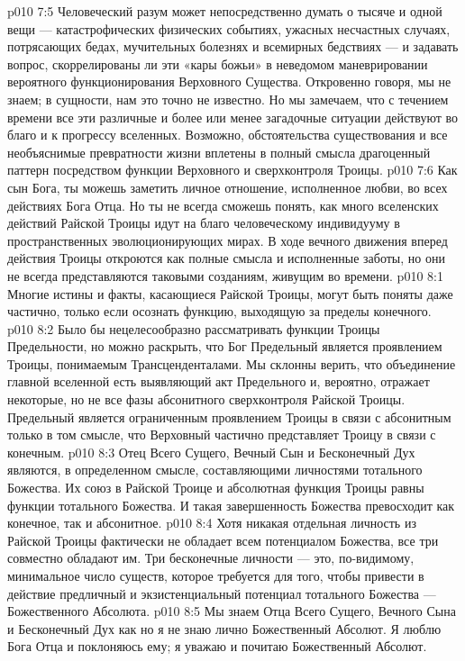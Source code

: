\vs p010 7:5 Человеческий разум может непосредственно думать о тысяче и одной вещи --- катастрофических физических событиях, ужасных несчастных случаях, потрясающих бедах, мучительных болезнях и всемирных бедствиях --- и задавать вопрос, скоррелированы ли эти «кары божьи» в неведомом маневрировании вероятного функционирования Верховного Существа. Откровенно говоря, мы не знаем; в сущности, нам это точно не известно. Но мы замечаем, что с течением времени все эти различные и более или менее загадочные ситуации  действуют во благо и к прогрессу вселенных. Возможно, обстоятельства существования и все необъяснимые превратности жизни вплетены в полный смысла драгоценный паттерн посредством функции Верховного и сверхконтроля Троицы.
\vs p010 7:6 Как сын Бога, ты можешь заметить личное отношение, исполненное любви, во всех действиях Бога Отца. Но ты не всегда сможешь понять, как много вселенских действий Райской Троицы идут на благо человеческому индивидууму в пространственных эволюционирующих мирах. В ходе вечного движения вперед действия Троицы откроются как полные смысла и исполненные заботы, но они не всегда представляются таковыми созданиям, живущим во времени.
\vs p010 8:1 Многие истины и факты, касающиеся Райской Троицы, могут быть поняты даже частично, только если осознать функцию, выходящую за пределы конечного.
\vs p010 8:2 Было бы нецелесообразно рассматривать функции Троицы Предельности, но можно раскрыть, что Бог Предельный является проявлением Троицы, понимаемым Трансценденталами. Мы склонны верить, что объединение главной вселенной есть выявляющий акт Предельного и, вероятно, отражает некоторые, но не все фазы абсонитного сверхконтроля Райской Троицы. Предельный является ограниченным проявлением Троицы в связи с абсонитным только в том смысле, что Верховный частично представляет Троицу в связи с конечным.
\vs p010 8:3 \pc Отец Всего Сущего, Вечный Сын и Бесконечный Дух являются, в определенном смысле, составляющими личностями тотального Божества. Их союз в Райской Троице и абсолютная функция Троицы равны функции тотального Божества. И такая завершенность Божества превосходит как конечное, так и абсонитное.
\vs p010 8:4 Хотя никакая отдельная личность из Райской Троицы фактически не обладает всем потенциалом Божества, все три совместно обладают им. Три бесконечные личности --- это, по\hyp{}видимому, минимальное число существ, которое требуется для того, чтобы привести в действие предличный и экзистенциальный потенциал тотального Божества --- Божественного Абсолюта.
\vs p010 8:5 Мы знаем Отца Всего Сущего, Вечного Сына и Бесконечный Дух как  но я не знаю лично Божественный Абсолют. Я люблю Бога Отца и поклоняюсь ему; я уважаю и почитаю Божественный Абсолют.
